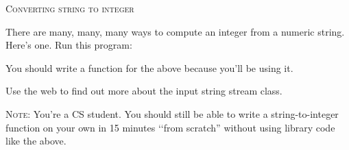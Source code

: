 \textsc{Converting string to integer}

There are many, many, many ways to compute an integer from a numeric string.
Here's one. Run this program:
You should write a function for the above because you'll be using it.

Use the web to find out more about the input string stream class.

\textsc{Note:}
You're a CS student.
You should still be able to write a string-to-integer function on your
own in 15 minutes \lq\lq from scratch''
without using library code like the above.

